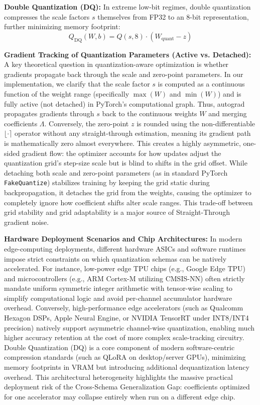 \textbf{Double Quantization (DQ):} In extreme low-bit regimes, double quantization compresses the scale factors $s$ themselves from FP32 to an 8-bit representation, further minimizing memory footprint:
\begin{equation}
    Q_{\text{DQ}}(W, b) = Q\left(s, 8\right) \cdot (W_{\text{quant}} - z)
\end{equation}

\textbf{Gradient Tracking of Quantization Parameters (Active vs. Detached):} A key theoretical question in quantization-aware optimization is whether gradients propagate back through the scale and zero-point parameters. In our implementation, we clarify that the scale factor $s$ is computed as a continuous function of the weight range (specifically $\max(W)$ and $\min(W)$) and is fully active (not detached) in PyTorch's computational graph. Thus, autograd propagates gradients through $s$ back to the continuous weights $W$ and merging coefficients $\Lambda$. Conversely, the zero-point $z$ is rounded using the non-differentiable $\lfloor \cdot \rceil$ operator without any straight-through estimation, meaning its gradient path is mathematically zero almost everywhere. This creates a highly asymmetric, one-sided gradient flow: the optimizer accounts for how updates adjust the quantization grid's step-size scale but is blind to shifts in the grid offset. While detaching both scale and zero-point parameters (as in standard PyTorch \texttt{FakeQuantize}) stabilizes training by keeping the grid static during backpropagation, it detaches the grid from the weights, causing the optimizer to completely ignore how coefficient shifts alter scale ranges. This trade-off between grid stability and grid adaptability is a major source of Straight-Through gradient noise.

\textbf{Hardware Deployment Scenarios and Chip Architectures:} In modern edge-computing deployments, different hardware ASICs and software runtimes impose strict constraints on which quantization schemas can be natively accelerated. For instance, low-power edge TPU chips (e.g., Google Edge TPU) and microcontrollers (e.g., ARM Cortex-M utilizing CMSIS-NN) often strictly mandate uniform symmetric integer arithmetic with tensor-wise scaling to simplify computational logic and avoid per-channel accumulator hardware overhead. Conversely, high-performance edge accelerators (such as Qualcomm Hexagon DSPs, Apple Neural Engine, or NVIDIA TensorRT under INT8/INT4 precision) natively support asymmetric channel-wise quantization, enabling much higher accuracy retention at the cost of more complex scale-tracking circuitry. Double Quantization (DQ) is a core component of modern software-centric compression standards (such as QLoRA on desktop/server GPUs), minimizing memory footprints in VRAM but introducing additional dequantization latency overhead. This architectural heterogeneity highlights the massive practical deployment risk of the Cross-Schema Generalization Gap: coefficients optimized for one accelerator may collapse entirely when run on a different edge chip.

